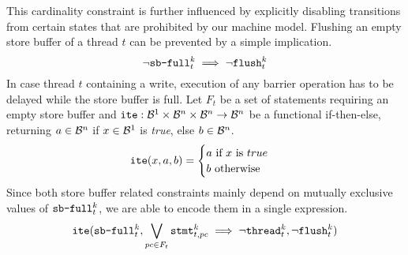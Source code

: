 This cardinality constraint is further influenced by explicitly disabling transitions from certain states that are prohibited by our machine model.
Flushing an empty store buffer of a thread $t$ can be prevented by a simple implication.
\[
  \lnot \SBFULL^k_t \implies \lnot \FLUSH^k_t
\]
In case thread $t$ containing a write, execution of any barrier operation has to be delayed while the store buffer is full.
Let $F_t$ be a set of statements requiring an empty store buffer
and $\ITE: \BVSORT[1] \times \BVSORT[n] \times \BVSORT[n] \to \BVSORT[n]$ be a functional if-then-else, returning $a \in \BVSORT[n]$ if $x \in \BVSORT[1]$ is \emph{true}, else $b \in \BVSORT[n]$.
\[
  \ITE(x, a, b) =
  \begin{cases}
    a \text{ if } x \text{ is } true \\
    b \text{ otherwise}
  \end{cases}
\]
Since both store buffer related constraints mainly depend on mutually exclusive values of $\SBFULL^k_t$, we are able to encode them in a single expression.
\[
  \ITE(\SBFULL^k_t, \bigvee_{pc \in F_t} \STMT^k_{t, pc} \implies \lnot \THREAD^k_t, \lnot \FLUSH^k_t)
\]
